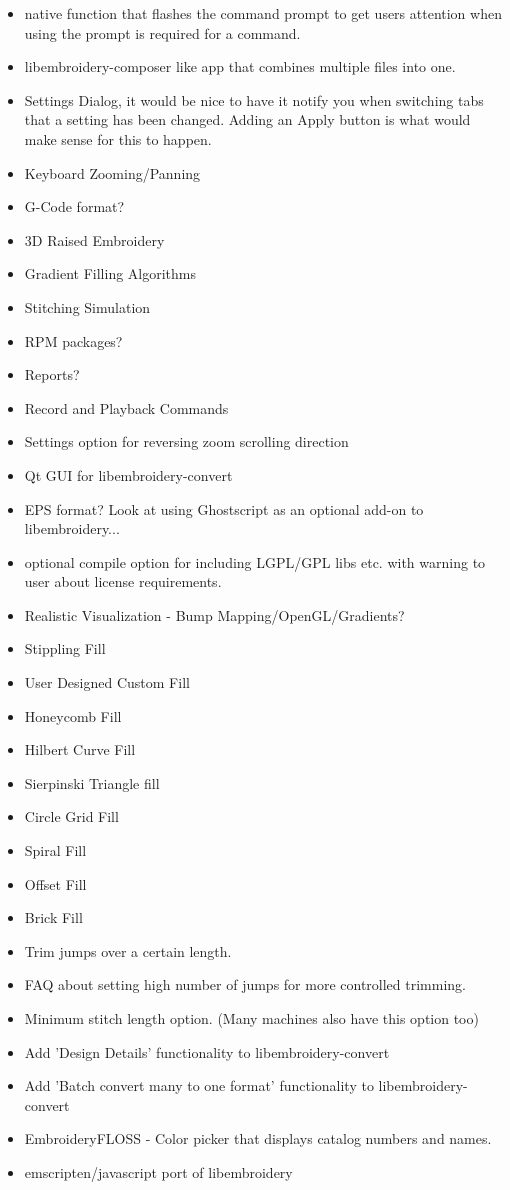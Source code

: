\begin{itemize}
\item native function that flashes the command prompt to get users attention when
    using the prompt is required for a command.
\item libembroidery-composer like app that combines multiple files into one.
\item Settings Dialog, it would be nice to have it notify you when switching tabs that
    a setting has been changed. Adding an Apply button is what would make sense for
    this to happen.
\item Keyboard Zooming/Panning
\item G-Code format?
\item 3D Raised Embroidery
\item Gradient Filling Algorithms
\item Stitching Simulation
\item RPM packages?
\item Reports?
\item Record and Playback Commands
\item Settings option for reversing zoom scrolling direction
\item Qt GUI for libembroidery-convert
\item EPS format? Look at using Ghostscript as an optional add-on to libembroidery...
\item optional compile option for including LGPL/GPL libs etc. with warning to user
    about license requirements.
\item Realistic Visualization - Bump Mapping/OpenGL/Gradients?
\item Stippling Fill
\item User Designed Custom Fill
\item Honeycomb Fill
\item Hilbert Curve Fill
\item Sierpinski Triangle fill
\item Circle Grid Fill
\item Spiral Fill
\item Offset Fill
\item Brick Fill
\item Trim jumps over a certain length.
\item FAQ about setting high number of jumps for more controlled trimming.
\item Minimum stitch length option. (Many machines also have this option too)
\item Add 'Design Details' functionality to libembroidery-convert
\item Add 'Batch convert many to one format' functionality to libembroidery-convert
\item EmbroideryFLOSS - Color picker that displays catalog numbers and names.
\item emscripten/javascript port of libembroidery
\end{itemize}

